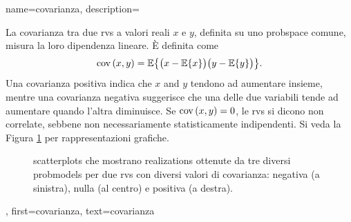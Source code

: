 {name={covarianza}, 
 description={La covarianza tra due 
 	\glspl{rv} a valori reali $x$ e $y$, definita su uno \gls{probspace} comune, misura la loro dipendenza 
 	lineare. È definita come 
			$$
			{\rm cov}\left(x,y\right) = \mathbb{E}\big\{ \big(x - \mathbb{E}\{ x\} \big)\big(y - \mathbb{E}\{y\} \big)\big\}.
			$$
	Una covarianza positiva indica che $x$ and $y$ tendono ad aumentare insieme, 
	mentre una covarianza negativa suggerisce che una delle due variabili tende ad aumentare quando l’altra diminuisce.
	Se ${\rm cov}\left(x,y\right) = 0$, le \glspl{rv} si dicono non correlate, sebbene non necessariamente statisticamente indipendenti. Si veda 
	la Figura \ref{fig:covariance-examples_dict} per rappresentazioni grafiche.
		\begin{figure}
			\caption{\Glspl{scatterplot} che mostrano \glspl{realization} ottenute da tre diversi \glspl{probmodel} per due 
				\glspl{rv} con diversi valori di covarianza: negativa (a sinistra), nulla (al centro) e positiva (a destra).}
			\label{fig:covariance-examples_dict}
		\end{figure}
		},
	first={covarianza},
	text={covarianza} 
}

